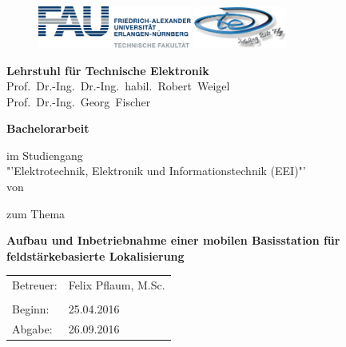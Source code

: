 \begin{titlepage}
\begin{figure}
\includegraphics[width=0.45\textwidth]{Abbildungen/Logo/FAUlogo}\hfill
\includegraphics[width=0.27\textwidth]{Abbildungen/Logo/LTElogo}
\end{figure}
\hspace{0.1cm}	
\center
\LARGE
	\textbf{Lehrstuhl für Technische Elektronik} \\
	Prof.~Dr.-Ing.~Dr.-Ing.~habil.~Robert~Weigel	\\
	Prof.~Dr.-Ing.~Georg~Fischer\\
\vspace{1cm}	

\LARGE
	\textbf{Bachelorarbeit}
\vspace{0.9cm}

\large
im Studiengang\\ "'Elektrotechnik, Elektronik und Informationstechnik (EEI)"'\\
\vspace{0.5cm}
von
\vspace{0.5cm}

\LARGE{
\authorname}
\vspace{0.7cm}

\large
zum Thema
\vspace{0.9cm}

\LARGE
\textbf{Aufbau und Inbetriebnahme einer mobilen Basisstation für 
feldstärkebasierte Lokalisierung}
\vspace{1.7cm}

\large
\begin{tabular}{ll}
Betreuer: & Felix Pflaum, M.Sc. \\
 &\\
Beginn: & 25.04.2016\\
Abgabe: & 26.09.2016\\
\end{tabular}
\end{titlepage}